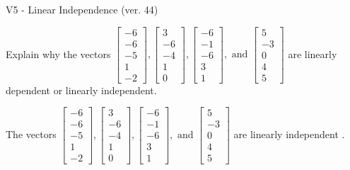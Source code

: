 \begin{exercise}
  \begin{exerciseTitle}V5 - Linear Independence (ver. 44)\end{exerciseTitle}
  \begin{exerciseStatement}
    Explain why the vectors \(\left[\begin{array}{r}
-6 \\
-6 \\
-5 \\
1 \\
-2
\end{array}\right] , \left[\begin{array}{r}
3 \\
-6 \\
-4 \\
1 \\
0
\end{array}\right] , \left[\begin{array}{r}
-6 \\
-1 \\
-6 \\
3 \\
1
\end{array}\right] , \text{ and } \left[\begin{array}{r}
5 \\
-3 \\
0 \\
4 \\
5
\end{array}\right]\) are linearly dependent or linearly independent.	


  \end{exerciseStatement}
  \begin{exerciseAnswer}
   The vectors \(\left[\begin{array}{r}
-6 \\
-6 \\
-5 \\
1 \\
-2
\end{array}\right] , \left[\begin{array}{r}
3 \\
-6 \\
-4 \\
1 \\
0
\end{array}\right] , \left[\begin{array}{r}
-6 \\
-1 \\
-6 \\
3 \\
1
\end{array}\right] , \text{ and } \left[\begin{array}{r}
5 \\
-3 \\
0 \\
4 \\
5
\end{array}\right]\) are 
  	 linearly independent  .
  


  \end{exerciseAnswer}
\end{exercise}